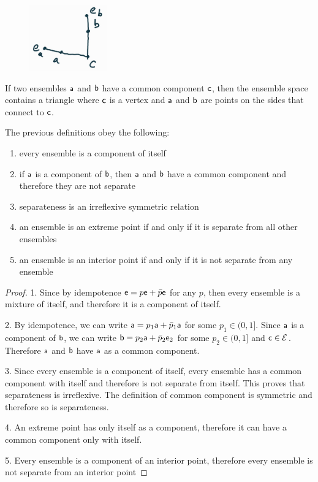 \begin{mathSection}
\begin{figure}[H]
	\centering
	\includegraphics[width=0.3\textwidth]{tempimages/CommonComponent.jpg}
\end{figure}

\begin{remark}
	If two ensembles $\ens[a]$ and $\ens[b]$ have a common component $\ens[c]$, then the ensemble space contains a triangle where $\ens[c]$ is a vertex and $\ens[a]$ and $\ens[b]$ are points on the sides that connect to $\ens[c]$.
\end{remark}

\begin{coro}
	The previous definitions obey the following:
	\begin{enumerate}
		\item every ensemble is a component of itself
		\item if $\ens[a]$ is a component of $\ens[b]$, then $\ens[a]$ and $\ens[b]$ have a common component and therefore they are not separate
		\item separateness is an irreflexive symmetric relation
		\item an ensemble is an extreme point if and only if it is separate from all other ensembles
		\item an ensemble is an interior point if and only if it is not separate from any ensemble
	\end{enumerate}
\end{coro}

\begin{proof}
	1. Since by idempotence $\ens = p \ens + \bar{p} \ens$ for any $p$, then every ensemble is a mixture of itself, and therefore it is a component of itself.
	
	2. By idempotence, we can write $\ens[a] = p_1 \ens[a] + \bar{p}_1 \ens[a]$ for some $p_1 \in (0,1]$. Since $\ens[a]$ is a component of $\ens[b]$, we can write $\ens[b] = p_2 \ens[a] + \bar{p}_2 \ens[e]_2$ for some $p_2 \in (0, 1]$ and $\ens[c] \in \Ens$. Therefore $\ens[a]$ and $\ens[b]$ have $\ens[a]$ as a common component.
	
	3. Since every ensemble is a component of itself, every ensemble has a common component with itself and therefore is not separate from itself. This proves that separateness is irreflexive. The definition of common component is symmetric and therefore so is separateness.
	
	4. An extreme point has only itself as a component, therefore it can have a common component only with itself.
	
	5. Every ensemble is a component of an interior point, therefore every ensemble is not separate from an interior point
\end{proof}
\end{mathSection}

